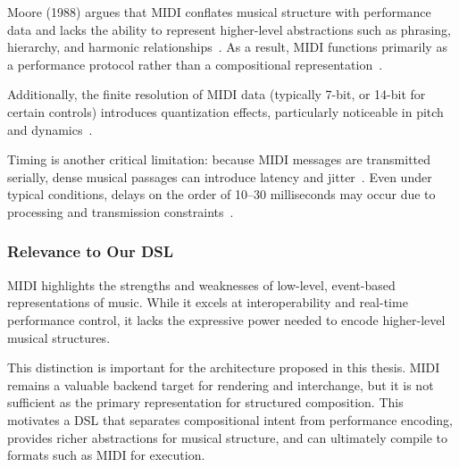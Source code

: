 Moore (1988) argues that MIDI conflates musical structure with performance data and lacks the ability to represent
higher-level abstractions such as phrasing, hierarchy, and harmonic relationships~\cite{Moore_1988}.
As a result, MIDI functions primarily as a performance protocol rather than a compositional
representation~\cite{Moore_1988}.

Additionally, the finite resolution of MIDI data (typically 7-bit, or 14-bit for certain controls) introduces
quantization effects, particularly noticeable in pitch and dynamics~\cite{Moore_1988}.

Timing is another critical limitation: because MIDI messages are transmitted serially, dense musical passages can
introduce latency and jitter~\cite{Moog_1986}.
Even under typical conditions, delays on the order of 10–30 milliseconds may occur due to processing and transmission
constraints~\cite{Moog_1986}.


\subsubsection{Relevance to Our DSL}

MIDI highlights the strengths and weaknesses of low-level, event-based representations of music.
While it excels at interoperability and real-time performance control, it lacks the expressive power needed to encode
higher-level musical structures.

This distinction is important for the architecture proposed in this thesis.
MIDI remains a valuable backend target for rendering and interchange, but it is not sufficient as the primary
representation for structured composition.
This motivates a DSL that separates compositional intent from performance encoding, provides richer abstractions for
musical structure, and can ultimately compile to formats such as MIDI for execution.
